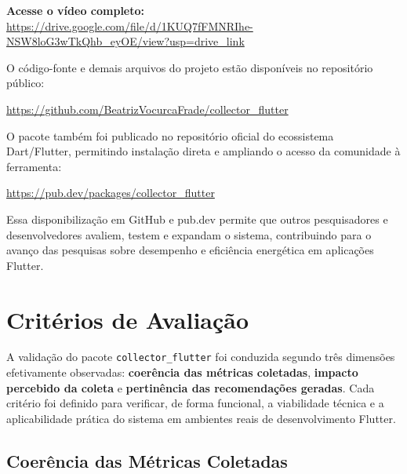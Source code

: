 \begin{center}
  \textbf{Acesse o vídeo completo:} \\
  \url{https://drive.google.com/file/d/1KUQ7fFMNRIhe-NSW8loG3wTkQhb_eyOE/view?usp=drive_link}
\end{center}

\noindent
O código-fonte e demais arquivos do projeto estão disponíveis no repositório público:

\begin{center}
  \url{https://github.com/BeatrizVocurcaFrade/collector_flutter}
\end{center}

\noindent
O pacote também foi publicado no repositório oficial do ecossistema Dart/Flutter, permitindo instalação direta e ampliando o acesso da comunidade à ferramenta:

\begin{center}
  \url{https://pub.dev/packages/collector_flutter}
\end{center}

Essa disponibilização em GitHub e pub.dev permite que outros pesquisadores e desenvolvedores avaliem, testem e expandam o sistema, contribuindo para o avanço das pesquisas sobre desempenho e eficiência energética em aplicações Flutter.







\section{Critérios de Avaliação}

A validação do pacote \texttt{collector\_flutter} foi conduzida segundo três dimensões efetivamente observadas: \textbf{coerência das métricas coletadas}, \textbf{impacto percebido da coleta} e \textbf{pertinência das recomendações geradas}.
Cada critério foi definido para verificar, de forma funcional, a viabilidade técnica e a aplicabilidade prática do sistema em ambientes reais de desenvolvimento Flutter.



\subsection{Coerência das Métricas Coletadas}

